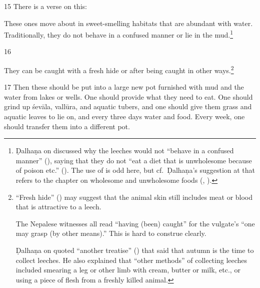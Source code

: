 \begin{translation}
\item[15]
There is a verse on this:

\begin{sloka}
    These ones move about in sweet-smelling habitats that are abundant with
water. Traditionally, they do not behave in a confused manner or lie in
the mud.\footnote{Ḍalhaṇa on  discussed why the leeches
    would not “behave in a confused manner” (), saying
    that they do not “eat a diet that is unwholesome because of poison etc.”
    ().  The use of  is odd
    here, but cf.\ Ḍalhaṇa's suggestion at
     that  refers to the chapter on wholesome and 
    unwholesome foods (, ).}
\end{sloka}

\item[16]

They can be caught with a fresh hide or after being caught in other
ways.\footnote{“Fresh hide” () may suggest that the animal
    skin still includes meat or blood that is attractive to a leech.

The Nepalese witnesses all read  “having (been) caught” for
the vulgate's  “one may grasp (by other means).” This is hard
to construe clearly.

   Ḍalhaṇa on  quoted “another treatise”
() that said that autumn is the time to collect
leeches.  He also explained that “other methods” of collecting leeches
included smearing a leg or other limb with cream, butter or milk, etc.,
or using a piece of flesh from a freshly killed animal.}


\item [17] Then these should be put into a large new pot furnished with mud
and the water from lakes or wells. One should provide what they need to eat.
One should grind up \gls{śevāla}, \gls{vallūra}, and aquatic tubers, and one
should give them grass and aquatic leaves to lie on, and every three days
water and food.
%    
Every week, one should transfer them into a different pot.


\end{translation}
